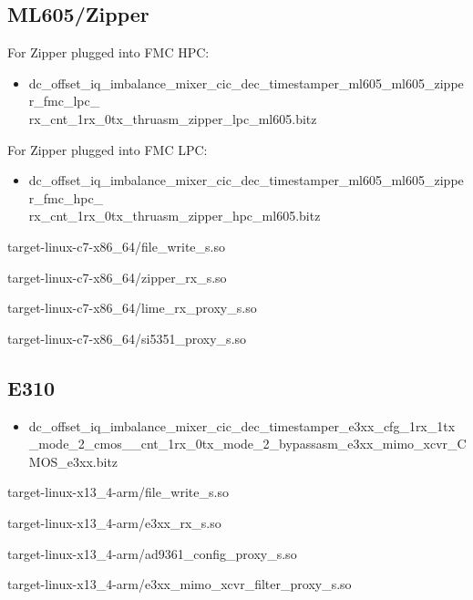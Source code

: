 \subsection{ML605/Zipper}
	For Zipper plugged into FMC HPC:
	\begin{itemize}
	\item
dc\_offset\_iq\_imbalance\_mixer\_cic\_dec\_timestamper\_ml605\_ml605\_zipper\_fmc\_lpc\_ \\ rx\_cnt\_1rx\_0tx\_thruasm\_zipper\_lpc\_ml605.bitz
 	\end{itemize}
	\noindent For Zipper plugged into FMC LPC:
	\begin{itemize}
	\item 
dc\_offset\_iq\_imbalance\_mixer\_cic\_dec\_timestamper\_ml605\_ml605\_zipper\_fmc\_hpc\_ \\
rx\_cnt\_1rx\_0tx\_thruasm\_zipper\_hpc\_ml605.bitz
	\end{itemize}
	\begin{itemize}
	\begin{minipage}[t]{.5\textwidth}
	\item target-linux-c7-x86\_64/file\_write\_s.so
	\item target-linux-c7-x86\_64/zipper\_rx\_s.so
	\end{minipage}
	\begin{minipage}[t]{.5\textwidth}
	\item target-linux-c7-x86\_64/lime\_rx\_proxy\_s.so
	\item target-linux-c7-x86\_64/si5351\_proxy\_s.so
	\end{minipage}
	\end{itemize}
\subsection{E310}
	\begin{itemize}
	\item dc\_offset\_iq\_imbalance\_mixer\_cic\_dec\_timestamper\_e3xx\_cfg\_1rx\_1tx \\ 
\_mode\_2\_cmos\_\_cnt\_1rx\_0tx\_mode\_2\_bypassasm\_e3xx\_mimo\_xcvr\_CMOS\_e3xx.bitz
	\end{itemize}
	\begin{itemize}
	\begin{minipage}[t]{.5\textwidth}
	\item target-linux-x13\_4-arm/file\_write\_s.so
	\item target-linux-x13\_4-arm/e3xx\_rx\_s.so
	\item target-linux-x13\_4-arm/ad9361\_config\_proxy\_s.so
	\item target-linux-x13\_4-arm/e3xx\_mimo\_xcvr\_filter\_proxy\_s.so
	\end{minipage}
	\end{itemize}

